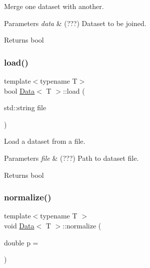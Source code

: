 Merge one dataset with another. 


\begin{DoxyParams}{Parameters}
{\em data} & (???) Dataset to be joined. \\
\hline
\end{DoxyParams}
\begin{DoxyReturn}{Returns}
bool 
\end{DoxyReturn}
\mbox{\label{class_data_a1d15d02eb38c6fb9ebf5d29ecafe7eee}} 
\subsubsection{\texorpdfstring{load()}{load()}}
{\footnotesize\ttfamily template$<$typename T$>$ \\
bool \hyperlink{class_data}{Data}$<$ T $>$\+::load (\begin{DoxyParamCaption}\item[{std\+::string}]{file }\end{DoxyParamCaption})}



Load a dataset from a file. 


\begin{DoxyParams}{Parameters}
{\em file} & (???) Path to dataset file. \\
\hline
\end{DoxyParams}
\begin{DoxyReturn}{Returns}
bool 
\end{DoxyReturn}
\mbox{\label{class_data_a3271dd8204296537222ed74c5aab1a03}} 
\subsubsection{\texorpdfstring{normalize()}{normalize()}\hspace{0.1cm}{\footnotesize\ttfamily [1/2]}}
{\footnotesize\ttfamily template$<$typename T $>$ \\
void \hyperlink{class_data}{Data}$<$ T $>$\+::normalize (\begin{DoxyParamCaption}\item[{double}]{p = {} }\end{DoxyParamCaption})}



